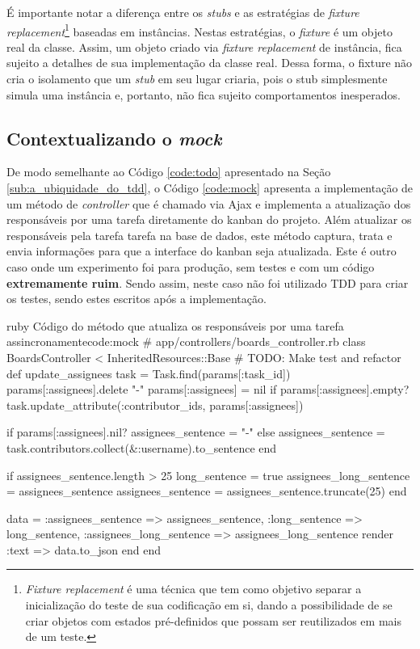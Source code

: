 É importante notar a diferença entre os \textit{stubs} e as estratégias de \textit{fixture replacement}\footnote{\textit{Fixture replacement} é uma técnica que tem como objetivo separar a inicialização do teste de sua codificação em si, dando a possibilidade de se criar objetos com estados pré-definidos que possam ser reutilizados em mais de um teste.} baseadas em instâncias. Nestas estratégias, o \textit{fixture} é um objeto real da classe. Assim, um objeto criado via \textit{fixture replacement} de instância, fica sujeito a detalhes de sua implementação da classe real. Dessa forma, o {fixture} não cria o isolamento que um \textit{stub} em seu lugar criaria, pois o stub simplesmente simula uma instância e, portanto, não fica sujeito comportamentos inesperados.


\subsection{Contextualizando o \textit{mock}}
\label{sub:contextualizando_o_mock}

De modo semelhante ao Código \ref{code:todo} apresentado na Seção \ref{sub:a_ubiquidade_do_tdd}, o Código \ref{code:mock} apresenta a implementação de um método de \textit{controller} que é chamado via Ajax e implementa a atualização dos responsáveis por uma tarefa diretamente do kanban do projeto. Além atualizar os responsáveis pela tarefa tarefa na base de dados, este método captura, trata e envia informações para que a interface do kanban seja atualizada. Este é outro caso onde um experimento foi para produção, sem testes e com um código \textbf{extremamente ruim}. Sendo assim, neste caso não foi utilizado TDD para criar os testes, sendo estes escritos após a implementação.

\begin{mycode}{ruby}%
{Código do método que atualiza os responsáveis por uma tarefa assincronamente}{code:mock}
# app/controllers/boards_controller.rb
class BoardsController < InheritedResources::Base
  # TODO: Make test and refactor
  def update_assignees
    task = Task.find(params[:task_id])
    params[:assignees].delete "-"
    params[:assignees] = nil if params[:assignees].empty?
    task.update_attribute(:contributor_ids, params[:assignees])

    if params[:assignees].nil?
      assignees_sentence = "-"
    else
      assignees_sentence = task.contributors.collect(&:username).to_sentence
    end

    if assignees_sentence.length > 25
      long_sentence = true
      assignees_long_sentence = assignees_sentence
      assignees_sentence = assignees_sentence.truncate(25)
    end

    data = { :assignees_sentence => assignees_sentence,
             :long_sentence => long_sentence,
             :assignees_long_sentence => assignees_long_sentence }
    render :text => data.to_json
  end
end
\end{mycode}

